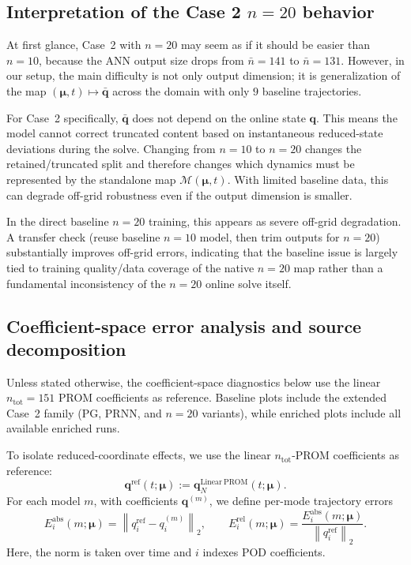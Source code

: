 \documentclass[11pt]{article}
\begin{document}
\subsection{Interpretation of the Case 2 $n=20$ behavior}
\label{sec:case2_n20_interp}

At first glance, Case~2 with $n=20$ may seem as if it should be easier than $n=10$, because the ANN output size drops from $\bar n=141$ to $\bar n=131$. However, in our setup, the main difficulty is not only output dimension; it is generalization of the map $(\bm\mu,t)\mapsto\bar{\mathbf q}$ across the domain with only $9$ baseline trajectories.

For Case~2 specifically, $\bar{\mathbf q}$ does not depend on the online state $\mathbf q$. This means the model cannot correct truncated content based on instantaneous reduced-state deviations during the solve. Changing from $n=10$ to $n=20$ changes the retained/truncated split and therefore changes which dynamics must be represented by the standalone map $\mathcal M(\bm\mu,t)$. With limited baseline data, this can degrade off-grid robustness even if the output dimension is smaller.

In the direct baseline $n=20$ training, this appears as severe off-grid degradation. A transfer check (reuse baseline $n=10$ model, then trim outputs for $n=20$) substantially improves off-grid errors, indicating that the baseline issue is largely tied to training quality/data coverage of the native $n=20$ map rather than a fundamental inconsistency of the $n=20$ online solve itself.

\subsection{Coefficient-space error analysis and source decomposition}
\label{sec:coeff_errors_250}

Unless stated otherwise, the coefficient-space diagnostics below use the linear $n_{\mathrm{tot}}=151$ PROM coefficients as reference. Baseline plots include the extended Case~2 family (PG, PRNN, and $n=20$ variants), while enriched plots include all available enriched runs.

To isolate reduced-coordinate effects, we use the linear $n_{\mathrm{tot}}$-PROM coefficients as reference:
\[
\mathbf q^{\mathrm{ref}}(t;\bm\mu) := \mathbf q_N^{\mathrm{Linear\ PROM}}(t;\bm\mu).
\]
For each model $m$, with coefficients $\mathbf q^{(m)}$, we define per-mode trajectory errors
\[
E_i^{\mathrm{abs}}(m;\bm\mu)=\left\|q_i^{\mathrm{ref}}-q_i^{(m)}\right\|_2,\qquad
E_i^{\mathrm{rel}}(m;\bm\mu)=\frac{E_i^{\mathrm{abs}}(m;\bm\mu)}{\left\|q_i^{\mathrm{ref}}\right\|_2}.
\]
Here, the norm is taken over time and $i$ indexes POD coefficients.
\end{document}
